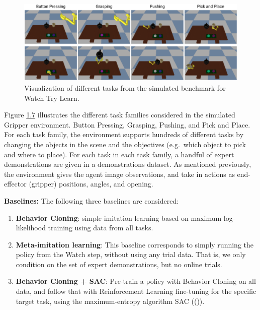\documentclass[
  letterpaper,
  DIV=11,
  numbers=noendperiod,
  oneside]{scrreprt}
\theoremstyle{remark}
\begin{document}
\begin{figure}

{\centering \includegraphics{src/Figures/watch-try-learn-envs.png}

}

\caption{Visualization of different tasks from the simulated benchmark
for Watch Try Learn.}

\end{figure}%

Figure \hyperref[fig:envs]{1.7} illustrates the different task families
considered in the simulated Gripper environment. Button Pressing,
Grasping, Pushing, and Pick and Place. For each task family, the
environment supports hundreds of different tasks by changing the objects
in the scene and the objectives (e.g.~which object to pick and where to
place). For each task in each task family, a handful of expert
demonstrations are given in a demonstrations dataset. As mentioned
previously, the environment gives the agent image observations, and take
in actions as end-effector (gripper) positions, angles, and opening.

\textbf{Baselines:} The following three baselines are considered:

\begin{enumerate}
\def\labelenumi{\arabic{enumi}.}
\item
  \textbf{Behavior Cloning}: simple imitation learning based on maximum
  log-likelihood training using data from all tasks.
\item
  \textbf{Meta-imitation learning}: This baseline corresponds to simply
  running the policy from the Watch step, without using any trial data.
  That is, we only condition on the set of expert demonstrations, but no
  online trials.
\item
  \textbf{Behavior Cloning + SAC}: Pre-train a policy with Behavior
  Cloning on all data, and follow that with Reinforcement Learning
  fine-tuning for the specific target task, using the maximum-entropy
  algorithm SAC (()).
\end{enumerate}
\end{document}
